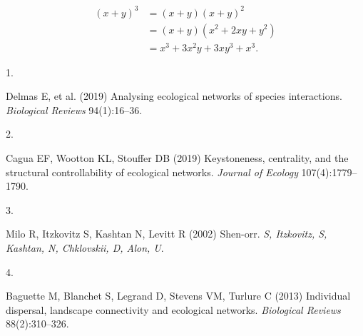 \documentclass[9pt,twocolumn,twoside,]{pnas-new}
\newlength{\cslhangindent}
\newlength{\csllabelwidth}
\newlength{\cslentryspacingunit} %
\newenvironment{CSLReferences}[2] %
 {%
  \setlength{\parindent}{0pt}
  \ifodd #1
  \let\oldpar\par
  \def\par{\hangindent=\cslhangindent\oldpar}
  \fi
  \setlength{\parskip}{#2\cslentryspacingunit}
 }%
 {}
\newcommand{\CSLLeftMargin}[1]{\parbox[t]{\csllabelwidth}{#1}}
\newcommand{\CSLRightInline}[1]{\parbox[t]{\linewidth - \csllabelwidth}{#1}\break}
\begin{document}
\[\begin{aligned}
(x+y)^3&=(x+y)(x+y)^2\\
       &=(x+y)(x^2+2xy+y^2) \label{eqn:example} \\
       &=x^3+3x^2y+3xy^3+x^3. 
\end{aligned}\]

\showmatmethods
\showacknow
\pnasbreak

\hypertarget{refs}{}
\begin{CSLReferences}{0}{0}
\leavevmode{}%
\CSLLeftMargin{1. }%
\CSLRightInline{Delmas E, et al. (2019) Analysing ecological networks of
species interactions. \emph{Biological Reviews} 94(1):16--36.}

\leavevmode{}%
\CSLLeftMargin{2. }%
\CSLRightInline{Cagua EF, Wootton KL, Stouffer DB (2019) Keystoneness,
centrality, and the structural controllability of ecological networks.
\emph{Journal of Ecology} 107(4):1779--1790.}

\leavevmode{}%
\CSLLeftMargin{3. }%
\CSLRightInline{Milo R, Itzkovitz S, Kashtan N, Levitt R (2002)
Shen-orr. \emph{S, Itzkovitz, S, Kashtan, N, Chklovskii, D, Alon, U}.}

\leavevmode{}%
\CSLLeftMargin{4. }%
\CSLRightInline{Baguette M, Blanchet S, Legrand D, Stevens VM, Turlure C
(2013) Individual dispersal, landscape connectivity and ecological
networks. \emph{Biological Reviews} 88(2):310--326.}

\end{CSLReferences}



% 
\end{document}
